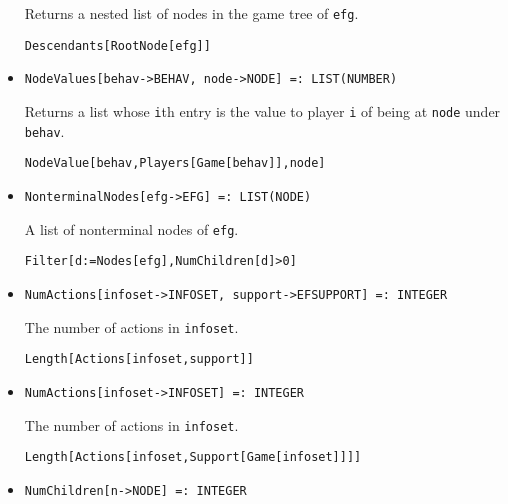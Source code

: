 \begin{itemize}
\bd 
Returns a nested list of nodes in the game tree of \verb+efg+.  
\begin{verbatim}
Descendants[RootNode[efg]]
\end{verbatim} 
\ed

\item{}
\protect \large \begin{verbatim}
NodeValues[behav->BEHAV, node->NODE] =: LIST(NUMBER) 
\end{verbatim}\normalsize

\bd 
Returns a list whose \verb+i+th entry is the value to player \verb+i+
of being at \verb+node+ under \verb+behav+.
\begin{verbatim}
NodeValue[behav,Players[Game[behav]],node]
\end{verbatim} 
\ed

\item{}
\protect \large \begin{verbatim}
NonterminalNodes[efg->EFG] =: LIST(NODE) 
\end{verbatim}\normalsize

\bd 
A list of nonterminal nodes of \verb+efg+.
\begin{verbatim}
Filter[d:=Nodes[efg],NumChildren[d]>0]
\end{verbatim} 
\ed

\item{}
\protect \large \begin{verbatim}
NumActions[infoset->INFOSET, support->EFSUPPORT] =: INTEGER 
\end{verbatim}\normalsize

\bd 
The number of actions in \verb+infoset+.
\begin{verbatim}
Length[Actions[infoset,support]] 
\end{verbatim} 
\ed

\item{}
\protect \large \begin{verbatim}
NumActions[infoset->INFOSET] =: INTEGER 
\end{verbatim}\normalsize

\bd 
The number of actions in  \verb+infoset+.
\begin{verbatim}
Length[Actions[infoset,Support[Game[infoset]]]] 
\end{verbatim} 
\ed

\item{}
\protect \large \begin{verbatim}
NumChildren[n->NODE] =: INTEGER 
\end{verbatim}\normalsize


\end{itemize}
